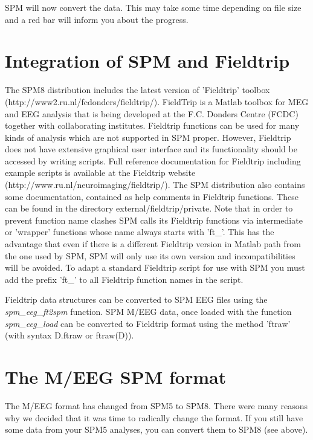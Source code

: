 SPM will now convert the data. This may take some time depending on
file size and a red bar will inform you about the progress.

\section{Integration of SPM and Fieldtrip}
The SPM8 distribution includes the latest version of 'Fieldtrip' toolbox
(http://www2.ru.nl/fcdonders/fieldtrip/). FieldTrip is a Matlab
toolbox for MEG and EEG analysis that is being developed at the
F.C. Donders Centre (FCDC) together with collaborating
institutes. Fieldtrip functions can be used for many kinds of analysis
which are not supported in SPM proper. However, Fieldtrip
does not have extensive graphical user interface and its functionality
should be accessed by writing scripts. Full reference documentation
for Fieldtrip including example scripts is available at the Fieldtrip
website (http://www.ru.nl/neuroimaging/fieldtrip/). The SPM
distribution also contains some documentation, contained as help
comments in Fieldtrip functions. These can be found in the directory 
external/fieldtrip/private. Note that in order to prevent function
name clashes SPM calls its Fieldtrip functions via 
intermediate or 'wrapper' functions whose name always starts with
'ft\_'. This has the advantage that even if there is a different Fieldtrip
version in Matlab path from the one used by SPM, SPM will only use its own
version and incompatibilities will be avoided. To adapt a standard
Fieldtrip script for use with SPM you must add the prefix 'ft\_' 
to all Fieldtrip function names in the script.

Fieldtrip data structures can be converted to SPM EEG files using
the \textit{spm\_eeg\_ft2spm} function.  SPM M/EEG data, once loaded
with the function \textit{spm\_eeg\_load} can be converted to Fieldtrip
format using the method 'ftraw' (with syntax D.ftraw or ftraw(D)).

\section{The M/EEG SPM format}
The M/EEG format has changed from SPM5 to SPM8. There were many
reasons why we decided that it was time to radically change the
format. If you still have some data from your SPM5 analyses, you can
convert them to SPM8 (see above). 

